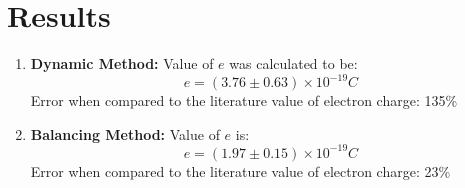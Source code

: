 \section{Results}
	\begin{enumerate}
		\item \textbf{Dynamic Method:}
		Value of $e$ was calculated to be:
		$$e=(3.76\pm0.63)\times10^{-19}C $$
		Error when compared to the literature value of electron charge: 135\%

		\item \textbf{Balancing Method:}
		Value of $e$ is:
		$$e=(1.97\pm0.15)\times10^{-19}C $$
		Error when compared to the literature value of electron charge: 23\%
	\end{enumerate}